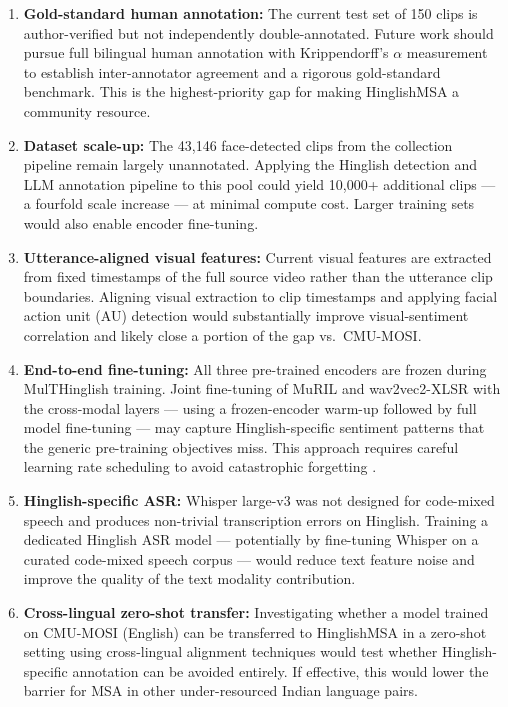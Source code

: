 \begin{enumerate}
    \item \textbf{Gold-standard human annotation:} The current test set of 150 clips is author-verified but not independently double-annotated. Future work should pursue full bilingual human annotation with Krippendorff's $\alpha$ measurement to establish inter-annotator agreement and a rigorous gold-standard benchmark. This is the highest-priority gap for making HinglishMSA a community resource.

    \item \textbf{Dataset scale-up:} The 43,146 face-detected clips from the collection pipeline remain largely unannotated. Applying the Hinglish detection and LLM annotation pipeline to this pool could yield 10,000+ additional clips --- a fourfold scale increase --- at minimal compute cost. Larger training sets would also enable encoder fine-tuning.

    \item \textbf{Utterance-aligned visual features:} Current visual features are extracted from fixed timestamps of the full source video rather than the utterance clip boundaries. Aligning visual extraction to clip timestamps and applying facial action unit (AU) detection \cite{busso2008iemocap} would substantially improve visual-sentiment correlation and likely close a portion of the gap vs.\ CMU-MOSI.

    \item \textbf{End-to-end fine-tuning:} All three pre-trained encoders are frozen during MulTHinglish training. Joint fine-tuning of MuRIL and wav2vec2-XLSR with the cross-modal layers --- using a frozen-encoder warm-up followed by full model fine-tuning --- may capture Hinglish-specific sentiment patterns that the generic pre-training objectives miss. This approach requires careful learning rate scheduling to avoid catastrophic forgetting \cite{lecun2015deep}.

    \item \textbf{Hinglish-specific ASR:} Whisper large-v3 was not designed for code-mixed speech and produces non-trivial transcription errors on Hinglish. Training a dedicated Hinglish ASR model --- potentially by fine-tuning Whisper on a curated code-mixed speech corpus --- would reduce text feature noise and improve the quality of the text modality contribution.

    \item \textbf{Cross-lingual zero-shot transfer:} Investigating whether a model trained on CMU-MOSI (English) can be transferred to HinglishMSA in a zero-shot setting using cross-lingual alignment techniques would test whether Hinglish-specific annotation can be avoided entirely. If effective, this would lower the barrier for MSA in other under-resourced Indian language pairs.


\end{enumerate}

